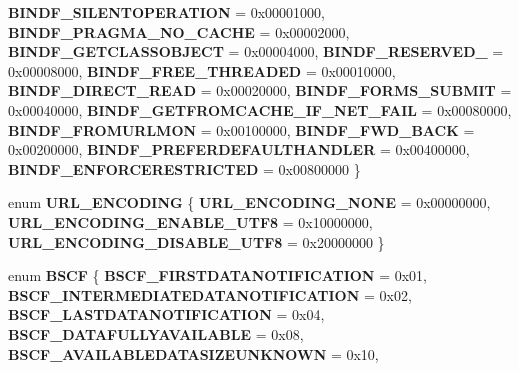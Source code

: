 \begin{DoxyCompactItemize}
\newline
{\bfseries B\+I\+N\+D\+F\+\_\+\+S\+I\+L\+E\+N\+T\+O\+P\+E\+R\+A\+T\+I\+ON} = 0x00001000, 
{\bfseries B\+I\+N\+D\+F\+\_\+\+P\+R\+A\+G\+M\+A\+\_\+\+N\+O\+\_\+\+C\+A\+C\+HE} = 0x00002000, 
{\bfseries B\+I\+N\+D\+F\+\_\+\+G\+E\+T\+C\+L\+A\+S\+S\+O\+B\+J\+E\+CT} = 0x00004000, 
{\bfseries B\+I\+N\+D\+F\+\_\+\+R\+E\+S\+E\+R\+V\+E\+D\+\_} = 0x00008000, 
\newline
{\bfseries B\+I\+N\+D\+F\+\_\+\+F\+R\+E\+E\+\_\+\+T\+H\+R\+E\+A\+D\+ED} = 0x00010000, 
{\bfseries B\+I\+N\+D\+F\+\_\+\+D\+I\+R\+E\+C\+T\+\_\+\+R\+E\+AD} = 0x00020000, 
{\bfseries B\+I\+N\+D\+F\+\_\+\+F\+O\+R\+M\+S\+\_\+\+S\+U\+B\+M\+IT} = 0x00040000, 
{\bfseries B\+I\+N\+D\+F\+\_\+\+G\+E\+T\+F\+R\+O\+M\+C\+A\+C\+H\+E\+\_\+\+I\+F\+\_\+\+N\+E\+T\+\_\+\+F\+A\+IL} = 0x00080000, 
\newline
{\bfseries B\+I\+N\+D\+F\+\_\+\+F\+R\+O\+M\+U\+R\+L\+M\+ON} = 0x00100000, 
{\bfseries B\+I\+N\+D\+F\+\_\+\+F\+W\+D\+\_\+\+B\+A\+CK} = 0x00200000, 
{\bfseries B\+I\+N\+D\+F\+\_\+\+P\+R\+E\+F\+E\+R\+D\+E\+F\+A\+U\+L\+T\+H\+A\+N\+D\+L\+ER} = 0x00400000, 
{\bfseries B\+I\+N\+D\+F\+\_\+\+E\+N\+F\+O\+R\+C\+E\+R\+E\+S\+T\+R\+I\+C\+T\+ED} = 0x00800000
 \}
\item 
\mbox{\label{interface_i_bind_status_callback_aaca37cc18240dfc56ec31d8c55befcdd}} 
enum {\bfseries U\+R\+L\+\_\+\+E\+N\+C\+O\+D\+I\+NG} \{ {\bfseries U\+R\+L\+\_\+\+E\+N\+C\+O\+D\+I\+N\+G\+\_\+\+N\+O\+NE} = 0x00000000, 
{\bfseries U\+R\+L\+\_\+\+E\+N\+C\+O\+D\+I\+N\+G\+\_\+\+E\+N\+A\+B\+L\+E\+\_\+\+U\+T\+F8} = 0x10000000, 
{\bfseries U\+R\+L\+\_\+\+E\+N\+C\+O\+D\+I\+N\+G\+\_\+\+D\+I\+S\+A\+B\+L\+E\+\_\+\+U\+T\+F8} = 0x20000000
 \}
\item 
\mbox{\label{interface_i_bind_status_callback_a799cf934bedab14861c8f949271945d4}} 
enum {\bfseries B\+S\+CF} \{ \newline
{\bfseries B\+S\+C\+F\+\_\+\+F\+I\+R\+S\+T\+D\+A\+T\+A\+N\+O\+T\+I\+F\+I\+C\+A\+T\+I\+ON} = 0x01, 
{\bfseries B\+S\+C\+F\+\_\+\+I\+N\+T\+E\+R\+M\+E\+D\+I\+A\+T\+E\+D\+A\+T\+A\+N\+O\+T\+I\+F\+I\+C\+A\+T\+I\+ON} = 0x02, 
{\bfseries B\+S\+C\+F\+\_\+\+L\+A\+S\+T\+D\+A\+T\+A\+N\+O\+T\+I\+F\+I\+C\+A\+T\+I\+ON} = 0x04, 
{\bfseries B\+S\+C\+F\+\_\+\+D\+A\+T\+A\+F\+U\+L\+L\+Y\+A\+V\+A\+I\+L\+A\+B\+LE} = 0x08, 
\newline
{\bfseries B\+S\+C\+F\+\_\+\+A\+V\+A\+I\+L\+A\+B\+L\+E\+D\+A\+T\+A\+S\+I\+Z\+E\+U\+N\+K\+N\+O\+WN} = 0x10, 

\end{DoxyCompactItemize}
